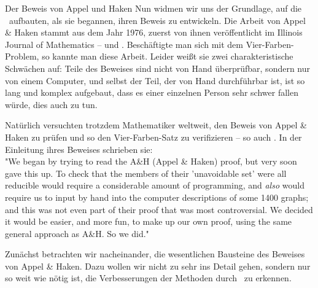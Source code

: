 \begin{chapter}{Der Beweis von Appel und Haken}
  Nun widmen wir uns der Grundlage, auf die \rsst\-\ aufbauten, als sie begannen, ihren Beweis zu entwickeln. Die Arbeit von Appel \& Haken stammt aus dem Jahr 1976, zuerst von ihnen veröffentlicht im Illinois Journal of Mathematics -- \cite{AH1} und \cite{AH2}. Beschäftigte man sich mit dem Vier-Farben-Problem, so kannte man diese Arbeit. Leider weißt sie zwei charakteristische Schwächen auf: Teile des Beweises sind nicht von Hand überprüfbar, sondern nur von einem Computer, und selbst der Teil, der von Hand durchführbar ist, ist so lang und komplex aufgebaut, dass es einer einzelnen Person sehr schwer fallen würde, dies auch zu tun.
  
  Natürlich versuchten trotzdem Mathematiker weltweit, den Beweis von Appel \& Haken zu prüfen und so den Vier-Farben-Satz zu verifizieren -- so auch \rsst. In der Einleitung ihres Beweises schrieben sie:\\  
  "We began by trying to read the A\&H (Appel \& Haken) proof, but very soon gave this up. To check that the members of their 'unavoidable set' were all reducible would require a considerable amount of programming, and \textit{also} would require us to input by hand into the computer descriptions of some 1400 graphs; and this was not even part of their proof that was most controversial. We decided it would be easier, and more fun, to make up our own proof, using the same general approach as A\&H. So we did."\cite[Einleitung]{FourRSST}
  
  Zunächst betrachten wir nacheinander, die wesentlichen Bausteine des Beweises von Appel \& Haken. Dazu wollen wir nicht zu sehr ins Detail gehen, sondern nur so weit wie nötig ist, die Verbesserungen der Methoden durch \rsst\-\ zu erkennen. 
  
  
  
 \end{chapter}